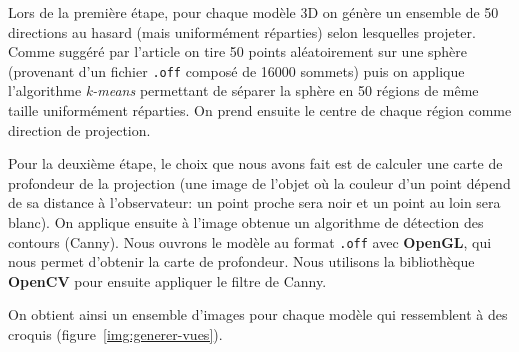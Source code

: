 \documentclass[12pt, a4paper, oneside]{article}
\begin{document}
Lors de la première étape, pour chaque modèle 3D on génère un ensemble de 50 directions au hasard (mais uniformément réparties) selon lesquelles projeter.
Comme suggéré par l'article on tire 50 points aléatoirement sur une sphère (provenant d'un fichier \verb|.off| composé de \num{16000} sommets) puis on applique l'algorithme \emph{k-means} permettant de séparer la sphère en 50 régions de même taille uniformément réparties.
On prend ensuite le centre de chaque région comme direction de projection.

Pour la deuxième étape, le choix que nous avons fait est de calculer une carte de profondeur de la projection (une image de l'objet où la couleur d'un point dépend de sa distance à l'observateur: un point proche sera noir et un point au loin sera blanc).
On applique ensuite à l'image obtenue un algorithme de détection des contours (Canny).
Nous ouvrons le modèle au format \verb|.off| avec \textbf{OpenGL}, qui nous permet d'obtenir la carte de profondeur. Nous utilisons la bibliothèque \textbf{OpenCV} pour ensuite appliquer le filtre de Canny.

On obtient ainsi un ensemble d'images pour chaque modèle qui ressemblent à des croquis (figure~\vref{img:generer-vues}).
\end{document}
